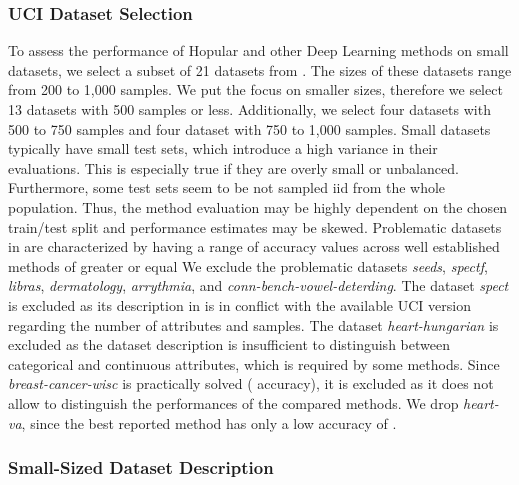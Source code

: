 \documentclass{article}
\theoremstyle{plain}
\theoremstyle{definition}
\theoremstyle{remark}
\begin{document}
\subsubsection{UCI Dataset Selection}
To assess the performance of Hopular and other Deep Learning methods 
on small datasets, 
we select a subset of 21 datasets from \citep{Klambauer:17}. 
The sizes of these datasets range from 200 to 1,000 samples.
We put the focus on smaller sizes, therefore we select
13 datasets with 500 samples or less.
Additionally, we select four datasets with 500 to 750 samples and 
four dataset with 750 to 1,000 samples. 
Small datasets typically have small test sets, 
which introduce a high variance in their evaluations.
This is especially true if they are overly small or unbalanced.
Furthermore, some test sets seem to be not sampled iid from the whole population. 
Thus, the method evaluation may be highly dependent on the chosen train/test split and
performance estimates may be skewed.
Problematic datasets in \citep{Klambauer:17} are characterized
by having a range of accuracy values across well established methods of greater or equal 
We exclude the problematic datasets 
{\em seeds}, {\em spectf}, {\em libras}, {\em dermatology}, {\em arrythmia}, 
and {\em conn-bench-vowel-deterding}.
The dataset {\em spect} is excluded as its description in \citep{Fernandez:14} 
is in conflict with the available UCI version regarding the number of attributes and samples.
The dataset
{\em heart-hungarian} is excluded as the dataset description 
is insufficient to distinguish between categorical and continuous attributes,
which is required by some methods.
Since {\em breast-cancer-wisc} is practically solved ( accuracy), it is excluded as
it does not allow to distinguish the performances of the compared methods.
We drop {\em heart-va}, 
since the best reported method has only a low accuracy of .

\pagebreak{}
\subsubsection{Small-Sized Dataset Description}
\end{document}
